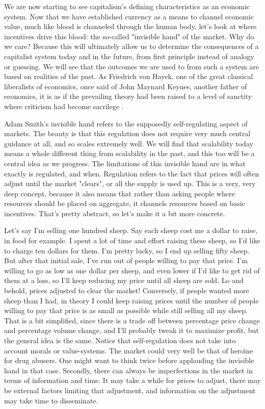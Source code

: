 \documentclass[12pt]{memoir}
\begin{document}
			We are now starting to see capitalism's defining characteristics as an economic system. Now that we have established currency as a means to channel economic value, much like blood is channeled 
			through the human body, let's look at where incentives drive this blood: the so-called "invisible hand" of the market. Why do we care? Because this will ultimately allow us to determine the consequences 
			of a capitalist system today and in the future, from first principle instead of analogy or guessing. We will see that the outcomes we are used to from such a system are based on realities of the past. 
			As Friedrich von Hayek, one of the great classical liberalists of economics, once said of John Maynard Keynes, another father of economics, it is as if the prevailing theory had been raised to a level of 
			sanctity where criticism had become sacrilege \cite{HayekOnKeynes1}.\
			
			Adam Smith's invisible hand refers to the supposedly self-regulating aspect of markets. The beauty is that this regulation does not require very much central guidance at all, and so scales extremely well. We will 
			find that scalability today means a whole different thing from scalability in the past, and this too will be a central idea as we progress. The limitations of this invisible hand are in what exactly 
			is regulated, and when. Regulation refers to the fact that prices will often adjust until the market "clears", or all the supply is used up. This is a very, very deep concept, because it also means that rather than 
			asking people where resources should be placed on aggregate, it channels resources based on basic incentives. That's pretty abstract, so let's make it a bit more concrete.\
			
			Let's say I'm selling one hundred sheep. Say each sheep cost me a dollar to raise, in food for example. I spent a lot of time and effort raising these sheep, so I'd like to charge ten dollars for them. I'm pretty 
			lucky, so I end up selling fifty sheep. But after that initial sale, I've run out of people willing to pay that price. I'm willing to go as low as one dollar per sheep, and even lower if I'd like to get rid of them at a loss, 
			so I'll keep reducing my price until all sheep are sold. Lo and behold, prices adjusted to clear the market! Conversely, if people wanted more sheep than I had, in theory I could keep raising prices 
			until the number of people willing to pay that price is as small as possible while still selling all my sheep. That is a bit simplified, since there is a trade off between percentage price change and 
			percentage volume change, and I'll probably tweak it to maximize profit, but the general idea is the same. Notice that self-regulation does not take into account morals or value-systems. The market could very 
			well be that of heroine for drug abusers. One might want to think twice before applauding the invisible hand in that case. Secondly, there can always be imperfections in the market in terms of information and 
			time. It may take a while for prices to adjust, there may be external factors limiting that adjustment, and  information on the adjustment may take time to disseminate.\
			
\end{document}
